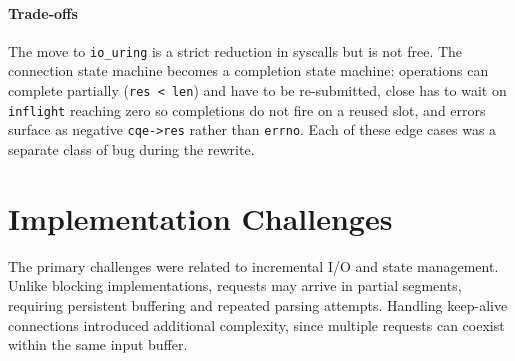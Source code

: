 \documentclass{article}
\begin{document}
\paragraph{Trade-offs} The move to \texttt{io\_uring} is a strict reduction in syscalls but
is not free. The connection state machine becomes a completion state machine: operations
can complete partially (\texttt{res < len}) and have to be re-submitted, close has to wait
on \texttt{inflight} reaching zero so completions do not fire on a reused slot, and errors
surface as negative \texttt{cqe->res} rather than \texttt{errno}. Each of these edge cases
was a separate class of bug during the rewrite.

%
%
%
\section{Implementation Challenges}

The primary challenges were related to incremental I/O and state management. Unlike blocking
implementations, requests may arrive in partial segments, requiring persistent buffering and
repeated parsing attempts. Handling keep-alive connections introduced additional complexity,
since multiple requests can coexist within the same input buffer.
\end{document}

